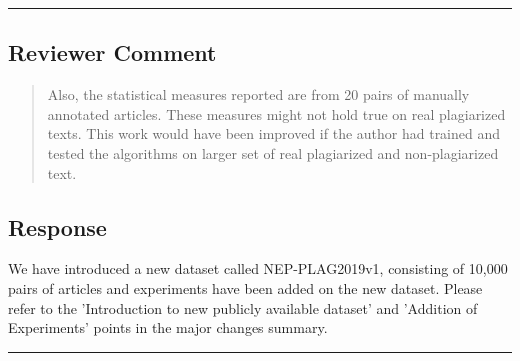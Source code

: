 \noindent\rule{17cm}{2.0pt}

\subsection{Reviewer Comment}
\begin{mdframed}
\begin{quote}
Also, the statistical measures reported are from 20 pairs of manually
annotated
articles. These measures might not hold true on real plagiarized
texts. This work
would have been improved if the author had trained and tested
the algorithms
on larger set of real plagiarized and non-plagiarized text.
\end{quote}
\end{mdframed}

\subsection{Response} 
We have introduced a new dataset called NEP-PLAG2019v1, consisting of 10,000
pairs of articles and experiments have been added on the new dataset. 
Please refer to the 'Introduction to new publicly available dataset'
and 'Addition of Experiments' points in the major changes summary.\\


\noindent\rule{17cm}{6.0pt}
